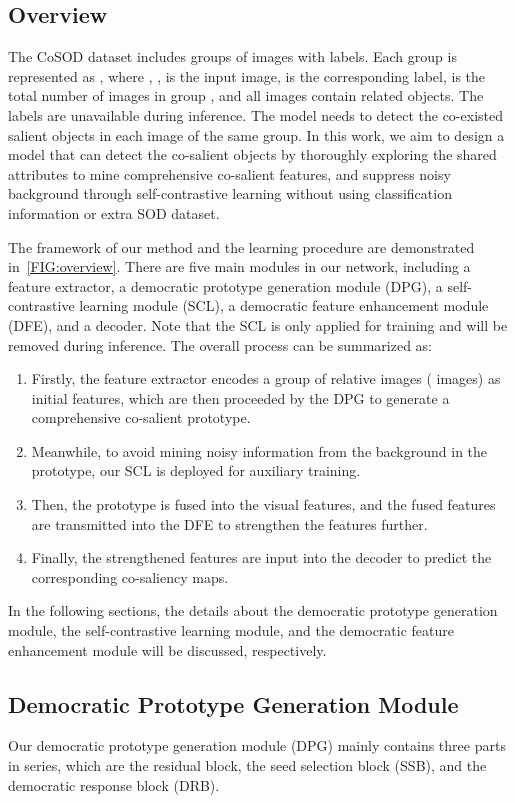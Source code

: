 \documentclass[10pt,twocolumn,letterpaper]{article}
\begin{document}
\subsection{Overview}
The CoSOD dataset includes groups of images with labels. Each group is represented as , where , ,  is the input image,  is the corresponding label,  is the total number of images in group , and all images contain related objects. The labels are unavailable during inference. The model needs to detect the co-existed salient objects in each image of the same group. In this work, we aim to design a model that can detect the co-salient objects by thoroughly exploring the shared attributes to mine comprehensive co-salient features, and suppress noisy background through self-contrastive learning without using classification information or extra SOD dataset. 

The framework of our method and the learning procedure are demonstrated in~\cref{FIG:overview}. There are five main modules in our network, including a feature extractor, a democratic prototype generation module (DPG), a self-contrastive learning module (SCL), a democratic feature enhancement module (DFE), and a decoder. Note that the SCL is only applied for training and will be removed during inference. The overall process can be summarized as:

\begin{enumerate}[1)]
    \item Firstly, the feature extractor encodes a group of relative images ( images) as initial features, which are then proceeded by the DPG to generate a comprehensive co-salient prototype. 
    \item Meanwhile, to avoid mining noisy information from the background in the prototype, our SCL is deployed for auxiliary training.
    \item Then, the prototype is fused into the visual features, and the fused features are transmitted into the DFE to strengthen the features further.
    \item Finally, the strengthened features are input into the decoder to predict the corresponding co-saliency maps.
\end{enumerate}

In the following sections, the details about the democratic prototype generation module, the self-contrastive learning module, and the democratic feature enhancement module will be discussed, respectively.

\subsection{Democratic Prototype Generation Module}
Our democratic prototype generation module (DPG) mainly contains three parts in series, which are the residual block, the seed selection block (SSB), and the democratic response block (DRB). 
\end{document}
